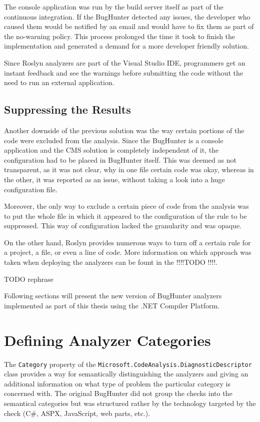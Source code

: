 \documentclass[
  digital, %
  table,   %
  lof,     %
  lot,     %
  oneside,
]{fithesis3}
\begin{document}
The console application was run by the build server itself as part of the continuous integration. If the BugHunter detected any issues, the developer who caused them would be notified by an email and would have to fix them as part of the no-warning policy. This process prolonged the time it took to finish the implementation and generated a demand for a more developer friendly solution. 

Since Roslyn analyzers are part of the Visual Studio IDE, programmers get an instant feedback and see the warnings before submitting the code without the need to run an external application.

\subsection{Suppressing the Results}
Another downside of the previous solution was the way certain portions of the code were excluded from the analysis. Since the BugHunter is a console application and the CMS solution is completely independent of it, the configuration had to be placed in BugHunter itself. This was deemed as not transparent, as it was not clear, why in one file certain code was okay, whereas in the other, it was reported as an issue, without taking a look into a huge configuration file.

Moreover, the only way to exclude a certain piece of code from the analysis was to put the whole file in which it appeared to the configuration of the rule to be suppressed. This way of configuration lacked the granularity and was opaque. 

On the other hand, Roslyn provides numerous ways to turn off a certain rule for a project, a file, or even a line of code. More information on which approach was taken when deploying the analyzers can be fount in the !!!!TODO !!!!.

\bigskip\noindent
TODO rephrase

Following sections will present the new version of BugHunter analyzers implemented as part of this thesis using the .NET Compiler Platform.

\section{Defining Analyzer Categories}
The \texttt{Category} property of the \texttt{Microsoft.CodeAnalysis.DiagnosticDescriptor} class provides a way for semantically distinguishing the analyzers and giving an additional information on what type of problem the particular category is concerned with. The original BugHunter did not group the checks into the semantical categories but was structured rather by the technology targeted by the check (C\#, ASPX, JavaScript, web parts, etc.). 
\end{document}
